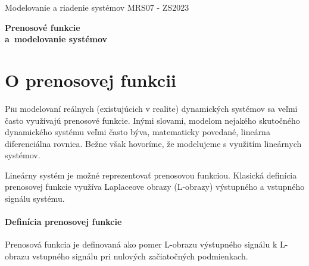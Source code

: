 \documentclass[a4paper, 10pt, ]{article}
\def\oznacenieCasti{MRS07 - ZS2023}
\begin{document}
\lstset{%
style=mystyle,
rangebeginprefix=\#\#\#\ cellB\ ,%
rangebeginsuffix=\ \#\#\#,%
rangeendprefix=\#\#\#\ cellE\ ,%
rangeendsuffix=\ \#\#\#,%
includerangemarker=false,
}




\fontsize{12pt}{22pt}\selectfont

\centerline{\textsf{Modelovanie a riadenie systémov} \hfill \textsf{\oznacenieCasti}}

\fontsize{18pt}{22pt}\selectfont





\begin{flushleft}
	\textbf{\textsf{Prenosové funkcie\\a~modelovanie systémov}}
\end{flushleft}





\normalsize

\bigskip

{\hypersetup{hidelinks}

\tableofcontents

}

\bigskip

\vspace{18pt}



\section{O prenosovej funkcii}

\lettrine[lines=3, nindent=0pt]{P}{ri}
modelovaní reálnych (existujúcich v realite) dynamických systémov sa veľmi často využívajú prenosové funkcie. Inými slovami, modelom nejakého skutočného dynamického systému veľmi často býva, matematicky povedané, lineárna diferenciálna rovnica. Bežne však hovoríme, že modelujeme s využitím lineárnych systémov.

\bigskip

\noindent
Lineárny systém je možné reprezentovať prenosovou funkciou. Klasická definícia prenosovej funkcie využíva Laplaceove obrazy (L-obrazy) výstupného a vstupného signálu systému.

\paragraph{Definícia prenosovej funkcie}

Prenosová funkcia je definovaná ako pomer L-obrazu výstupného signálu k L-obrazu vstupného signálu pri nulových začiatočných podmienkach.
\end{document}
